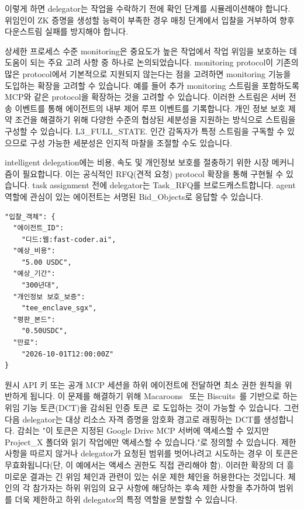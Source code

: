 \documentclass[11pt, a4paper, twocolumn, copyright, goog]{google}
\begin{document}
이렇게 하면 delegator는 작업을 수락하기 전에 확인 단계를 시뮬레이션해야 합니다. 위임인이 ZK 증명을 생성할 능력이 부족한 경우 매칭 단계에서 입찰을 거부하여 향후 다운스트림 실패를 방지해야 합니다.

상세한 프로세스 수준 monitoring은 중요도가 높은 작업에서 작업 위임을 보호하는 데 도움이 되는 주요 고려 사항 중 하나로 논의되었습니다. monitoring protocol이 기존의 많은 protocol에서 기본적으로 지원되지 않는다는 점을 고려하면 monitoring 기능을 도입하는 확장을 고려할 수 있습니다. 예를 들어 추가 monitoring 스트림을 포함하도록 MCP와 같은 protocol을 확장하는 것을 고려할 수 있습니다. 이러한 스트림은 서버 전송 이벤트를 통해 에이전트의 내부 제어 루프 이벤트를 기록합니다. 개인 정보 보호 제약 조건을 해결하기 위해 다양한 수준의 협상된 세분성을 지원하는 방식으로 스트림을 구성할 수 있습니다. L3\_FULL\_STATE. 인간 감독자가 특정 스트림을 구독할 수 있으므로 구성 가능한 세분성은 인지적 마찰을 조절할 수도 있습니다.

intelligent delegation에는 비용, 속도 및 개인정보 보호를 절충하기 위한 시장 메커니즘이 필요합니다. 이는 공식적인 RFQ(견적 요청) protocol 확장을 통해 구현될 수 있습니다. task assignment 전에 delegator는 Task\_RFQ를 브로드캐스트합니다. agent 역할에 관심이 있는 에이전트는 서명된 Bid\_Objects로 응답할 수 있습니다.

\begin{verbatim}
"입찰_객체": {
  "에이전트_ID":
    "디드:웹:fast-coder.ai",
  "예상_비용":
    "5.00 USDC",
  "예상_기간":
    "300년대",
  "개인정보 보호_보증":
    "tee_enclave_sgx",
  "평판_본드":
    "0.50USDC",
  "만료":
    "2026-10-01T12:00:00Z"
}
\end{verbatim}

원시 API 키 또는 공개 MCP 세션을 하위 에이전트에 전달하면 최소 권한 원칙을 위반하게 됩니다. 이 문제를 해결하기 위해 Macaroons~\citep{birgisson2014macaroons} 또는 Biscuits~\citep{biscuit}를 기반으로 하는 위임 기능 토큰(DCT)을 감쇠된 인증 토큰~\citep{sanabria2025sumunlockingaiagents}로 도입하는 것이 가능할 수 있습니다. 그런 다음 delegator는 대상 리소스 자격 증명을 암호화 경고로 래핑하는 DCT를 생성합니다. 감쇠는 "이 토큰은 지정된 Google Drive MCP 서버에 액세스할 수 있지만 Project\_X 폴더와 읽기 작업에만 액세스할 수 있습니다."로 정의할 수 있습니다. 제한 사항을 따르지 않거나 delegator가 요청된 범위를 벗어나려고 시도하는 경우 이 토큰은 무효화됩니다(단, 이 예에서는 액세스 권한도 직접 관리해야 함). 이러한 확장의 더 흥미로운 결과는 긴 위임 체인과 관련이 있는 쉬운 제한 체인을 허용한다는 것입니다. 체인의 각 참가자는 하위 위임의 요구 사항에 해당하는 후속 제한 사항을 추가하여 범위를 더욱 제한하고 하위 delegator의 특정 역할을 분할할 수 있습니다.
\end{document}

